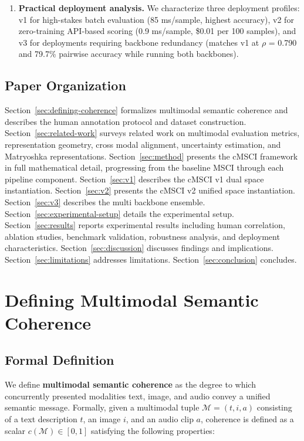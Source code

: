\documentclass[a4paper,fleqn]{cas-sc}
\begin{document}
\begin{enumerate}
\item \textbf{Practical deployment analysis.} We characterize three deployment profiles: v1 for high-stakes batch evaluation (85 ms/sample, highest accuracy), v2 for zero-training API-based scoring (0.9 ms/sample, \$0.01 per 100 samples), and v3 for deployments requiring backbone redundancy (matches v1 at $\rho$ = 0.790 and 79.7\% pairwise accuracy while running both backbones).
\end{enumerate}


\subsection{Paper Organization}\label{sec:paper-organization}

Section~\ref{sec:defining-coherence} formalizes multimodal semantic coherence and describes the human annotation protocol and dataset construction. Section~\ref{sec:related-work} surveys related work on multimodal evaluation metrics, representation geometry, cross modal alignment, uncertainty estimation, and Matryoshka representations. Section~\ref{sec:method} presents the cMSCI framework in full mathematical detail, progressing from the baseline MSCI through each pipeline component. Section~\ref{sec:v1} describes the cMSCI v1 dual space instantiation. Section~\ref{sec:v2} presents the cMSCI v2 unified space instantiation. Section~\ref{sec:v3} describes the multi backbone ensemble. Section~\ref{sec:experimental-setup} details the experimental setup. Section~\ref{sec:results} reports experimental results including human correlation, ablation studies, benchmark validation, robustness analysis, and deployment characteristics. Section~\ref{sec:discussion} discusses findings and implications. Section~\ref{sec:limitations} addresses limitations. Section~\ref{sec:conclusion} concludes.



\section{Defining Multimodal Semantic Coherence}

\subsection{Formal Definition}

We define \textbf{multimodal semantic coherence} as the degree to which concurrently presented modalities text, image, and audio convey a unified semantic message. Formally, given a multimodal tuple $\mathcal{M} = (t, i, a)$ consisting of a text description $t$, an image $i$, and an audio clip $a$, coherence is defined as a scalar $c(\mathcal{M}) \in [0,1]$ satisfying the following properties:
\end{document}
